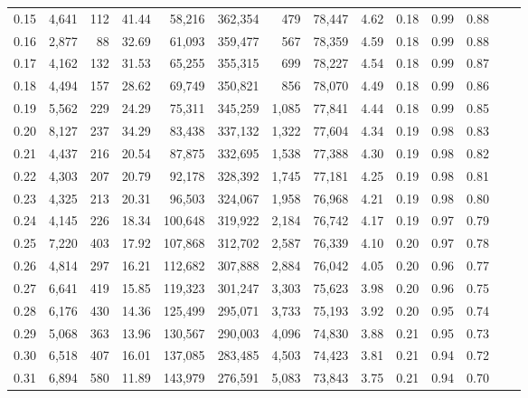 \begin{tabular}{rrrrrrrrrrrrrr}
0.15 &   4,641 &    112 &   41.44 &   58,216 &  362,354 &     479 &  78,447 &  4.62 &  0.18 &  0.99 &      0.88 \\
0.16 &   2,877 &     88 &   32.69 &   61,093 &  359,477 &     567 &  78,359 &  4.59 &  0.18 &  0.99 &      0.88 \\
0.17 &   4,162 &    132 &   31.53 &   65,255 &  355,315 &     699 &  78,227 &  4.54 &  0.18 &  0.99 &      0.87 \\
0.18 &   4,494 &    157 &   28.62 &   69,749 &  350,821 &     856 &  78,070 &  4.49 &  0.18 &  0.99 &      0.86 \\
0.19 &   5,562 &    229 &   24.29 &   75,311 &  345,259 &   1,085 &  77,841 &  4.44 &  0.18 &  0.99 &      0.85 \\
0.20 &   8,127 &    237 &   34.29 &   83,438 &  337,132 &   1,322 &  77,604 &  4.34 &  0.19 &  0.98 &      0.83 \\
0.21 &   4,437 &    216 &   20.54 &   87,875 &  332,695 &   1,538 &  77,388 &  4.30 &  0.19 &  0.98 &      0.82 \\
0.22 &   4,303 &    207 &   20.79 &   92,178 &  328,392 &   1,745 &  77,181 &  4.25 &  0.19 &  0.98 &      0.81 \\
0.23 &   4,325 &    213 &   20.31 &   96,503 &  324,067 &   1,958 &  76,968 &  4.21 &  0.19 &  0.98 &      0.80 \\
0.24 &   4,145 &    226 &   18.34 &  100,648 &  319,922 &   2,184 &  76,742 &  4.17 &  0.19 &  0.97 &      0.79 \\
0.25 &   7,220 &    403 &   17.92 &  107,868 &  312,702 &   2,587 &  76,339 &  4.10 &  0.20 &  0.97 &      0.78 \\
0.26 &   4,814 &    297 &   16.21 &  112,682 &  307,888 &   2,884 &  76,042 &  4.05 &  0.20 &  0.96 &      0.77 \\
0.27 &   6,641 &    419 &   15.85 &  119,323 &  301,247 &   3,303 &  75,623 &  3.98 &  0.20 &  0.96 &      0.75 \\
0.28 &   6,176 &    430 &   14.36 &  125,499 &  295,071 &   3,733 &  75,193 &  3.92 &  0.20 &  0.95 &      0.74 \\
0.29 &   5,068 &    363 &   13.96 &  130,567 &  290,003 &   4,096 &  74,830 &  3.88 &  0.21 &  0.95 &      0.73 \\
0.30 &   6,518 &    407 &   16.01 &  137,085 &  283,485 &   4,503 &  74,423 &  3.81 &  0.21 &  0.94 &      0.72 \\
0.31 &   6,894 &    580 &   11.89 &  143,979 &  276,591 &   5,083 &  73,843 &  3.75 &  0.21 &  0.94 &      0.70 \\

\end{tabular}
